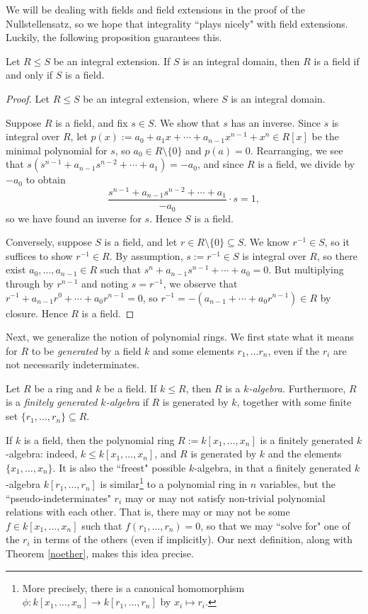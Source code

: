 \documentclass{article}
\begin{document}
We will be dealing with fields and field extensions in the proof of the Nullstellensatz, so we hope that integrality ``plays nicely" with field extensions. Luckily, the following proposition guarantees this.
\begin{proposition}\label{fieldifffield}
Let $R\leq S$ be an integral extension. If $S$ is an integral domain, then $R$ is a field if and only if $S$ is a field.
\end{proposition}
\begin{proof}
Let $R\leq S$ be an integral extension, where $S$ is an integral domain.

Suppose $R$ is a field, and fix $s\in S$. We show that $s$ has an inverse. Since $s$ is integral over $R$, let $p(x) := a_0 + a_1x + \cdots + a_{n-1}x^{n-1} + x^n\in R[x]$ be the minimal polynomial for $s$, so $a_0\in R\setminus\{0\}$ and $p(a) = 0$. Rearranging, we see that $s(s^{n-1} + a_{n-1}s^{n-2} + \cdots + a_1) = -a_0$, and since $R$ is a field, we divide by $-a_0$ to obtain
$$\frac{s^{n-1}+a_{n-1}s^{n-2}+\cdots + a_1}{-a_0}\cdot s = 1,$$
so we have found an inverse for $s$. Hence $S$ is a field.

Conversely, suppose $S$ is a field, and let $r\in R\setminus \{0\}\subseteq S$. We know $r^{-1}\in S$, so it suffices to show $r^{-1}\in R$. By assumption, $s:= r^{-1}\in S$ is integral over $R$, so there exist $a_0, \ldots, a_{n-1}\in R$ such that $s^n + a_{n-1}s^{n-1} + \cdots + a_0 = 0$. But multiplying through by $r^{n-1}$ and noting $s = r^{-1}$, we observe that $r^{-1} + a_{n-1}r^{0} + \cdots + a_0r^{n-1} = 0$, so $r^{-1} = -(a_{n-1} + \cdots + a_0r^{n-1}) \in R$ by closure. Hence $R$ is a field.
\end{proof}

Next, we generalize the notion of polynomial rings. We first state what it means for $R$ to be \textit{generated} by a field $k$ and some elements $r_1,\ldots r_n$, even if the $r_i$ are not necessarily indeterminates.

\begin{definition}
Let $R$ be a ring and $k$ be a field. If $k\leq R$, then $R$ is a \textit{$k$-algebra.} Furthermore, $R$ is a \textit{finitely generated $k$-algebra} if $R$ is generated by $k$, together with some finite set $\{r_1, \ldots, r_n\}\subseteq R$.
\end{definition}

If $k$ is a field, then the polynomial ring $R := k[x_1, \ldots, x_n]$ is a finitely generated $k$-algebra: indeed, $k\leq k[x_1, \ldots, x_n]$, and $R$ is generated by $k$ and the elements $\{x_1, \ldots, x_n\}$. It is also the ``freest" possible $k$-algebra, in that a finitely generated $k$-algebra $k[r_1,\ldots, r_n]$ is similar\footnote{More precisely, there is a canonical homomorphism $\phi: k[x_1, \ldots, x_n] \to k[r_1, \ldots, r_n]$ by $x_i\mapsto r_i$.} to a polynomial ring in $n$ variables, but the ``pseudo-indeterminates" $r_i$ may or may not satisfy non-trivial polynomial relations with each other. That is, there may or may not be some $f\in k[x_1, \ldots, x_n]$ such that $f(r_1,\ldots, r_n) = 0$, so that we may ``solve for" one of the $r_i$ in terms of the others (even if implicitly). Our next definition, along with Theorem \ref{noether}, makes this idea precise.
\end{document}
